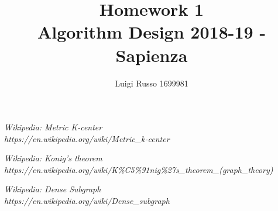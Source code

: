 \documentclass[12pt]{article}
\title{Homework 1\\
	\large Algorithm Design 2018-19 - Sapienza}
\author{Luigi Russo 1699981}
\begin{document}
	
\maketitle

\newpage
\tableofcontents
\newpage







\begin{thebibliography}{10}
	
	\textsl{Wikipedia: Metric K-center} \\
	\textit{https://en.wikipedia.org/wiki/Metric\_k-center}

	\textsl{Wikipedia: Konig's theorem} \\
	\textit{https://en.wikipedia.org/wiki/K\%C5\%91nig\%27s\_theorem\_(graph\_theory)}
	
	\textsl{Wikipedia: Dense Subgraph} \\
	\textit{https://en.wikipedia.org/wiki/Dense\_subgraph}	
	
\end{thebibliography}
\end{document}
